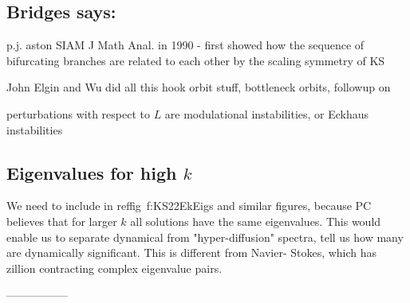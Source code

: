 \subsection{Bridges says:}

p.j. aston SIAM J Math Anal. in 1990 - first showed how the sequence of bifurcating branches
are related to each other by the scaling symmetry of KS

John Elgin and Wu did all this hook orbit stuff, bottleneck orbits, followup on

perturbations with respect to $L$ are modulational instabilities, or Eckhaus  instabilities


\subsection{Eigenvalues for high $k$}

We need to include  
in reffig~{f:KS22EkEigs} and similar figures, because
PC believes that for larger $k$ all solutions have the same eigenvalues. This
    would enable us to separate dynamical from "hyper-diffusion" spectra,
    tell us how many are dynamically significant. This is different from Navier-
Stokes,
    which has zillion contracting complex eigenvalue pairs.

-----------------



\bigskip

